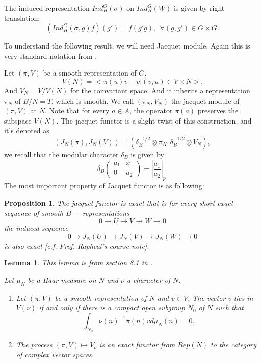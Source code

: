 \documentclass[12pt,a4paper,english]{article}
\theoremstyle{plain}
\newtheorem{lem}[thm]{Lemma}
\newtheorem{prop}[thm]{Proposition}
\theoremstyle{definition}
\begin{document}
The induced representation $Ind^{G}_{H}(\sigma)$ on $Ind^{G}_{H}(W)$ is given by right translation:
\begin{equation*}
    (Ind^{G}_{H}(\sigma, g)f)(g')=f(g'g),\ \ \forall (g, g')\in G\times G.
\end{equation*}

To understand the following result, we will need Jacquet module.
Again this is very standard notation from \cite{bushnell2006local}.

Let $(\pi, V)$ be a smooth representation of $G$. 
\begin{equation*}
    V(N)=<\pi(u)v-v | (v, u)\in V\times N>.
\end{equation*}
And $V_{N}=V/ V(N)$ for the coinvariant space. And it inherits a representation $\pi_{N}$ of $B/N=T$, which is smooth. We call $(\pi_{N}, V_{N})$ the jacquet module of $(\pi, V)$ at $N$. Note that for every $a\in A$, the operator $\pi(a)$ preserves the subspace $V(N)$. The jacquet functor is a slight twist of this construction, and it's denoted as
\begin{equation*}
    (J_{N}(\pi), J_{N}(V))=(\delta^{-1/2}_{B}\otimes \pi_{N},\delta^{-1/2}_{B}\otimes V_{N}),
\end{equation*}
we recall that the modular character $\delta_{B}$ is given by 
\begin{equation*}
       \delta_{B} \begin{pmatrix} a_{1} & x \\ 0 & a_{2} \end{pmatrix}=|\frac{a_{1}}{a_{2}}|_{p}.
\end{equation*}
The most important property of Jacquet functor is as following:
\begin{prop}
The jacquet functor is exact that is for every short exact sequence of smooth $B-$ representations
\begin{equation*}
    0\rightarrow U\rightarrow V\rightarrow W\rightarrow 0
\end{equation*}
the induced sequence \begin{equation*}
    0\rightarrow J_{N}(U)\rightarrow J_{N}(V)\rightarrow J_{N}(W)\rightarrow 0
\end{equation*}
is also exact [c.f. Prof. Rapheal's course note].
\end{prop}
\begin{lem}\label{lem2}
This lemma is from section 8.1 in \cite{bushnell2006local}.

Let $\mu_{N}$ be a Haar measure on $N$ and $\nu$ a character of $N$.
\begin{enumerate}
    \item Let $(\pi, V)$ be a smooth representation of $N$ and $v\in V$. The vector $v$ lies in $V(\nu)$ if and only if there is a compact open subgroup $N_{0}$ of $N$ such that 
    \begin{equation*}
        \int_{N_{0}}\nu(n)^{-1}\pi(n)vd\mu_{N}(n)=0.
    \end{equation*}
    \item The process $(\pi, V)\mapsto V_{\nu}$ is an exact functor from $Rep(N)$ to the category of complex vector spaces.
\end{enumerate}
\end{lem}
\end{document}
